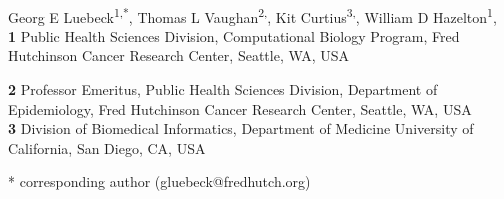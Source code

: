 \documentclass[10pt,letterpaper]{article}
\begin{document}
\vspace*{0.2in}

\begin{flushleft}
{\Large
\textbf{}}
\newline
\\
Georg E Luebeck\textsuperscript{1,*},
Thomas L Vaughan\textsuperscript{2,},
Kit Curtius\textsuperscript{3,},
William D Hazelton\textsuperscript{1},
\\
\bigskip
\textbf{1} Public Health Sciences Division, Computational Biology Program, Fred Hutchinson Cancer Research Center, Seattle, WA, USA

\textbf{2} Professor Emeritus, Public Health Sciences Division, Department of Epidemiology, Fred Hutchinson Cancer Research Center, Seattle, WA, USA
\\
\textbf{3} Division of Biomedical Informatics, Department of Medicine
University of California, San Diego, CA, USA
\\
\bigskip

% 
%





* corresponding author (gluebeck@fredhutch.org)

\end{flushleft}
\end{document}
